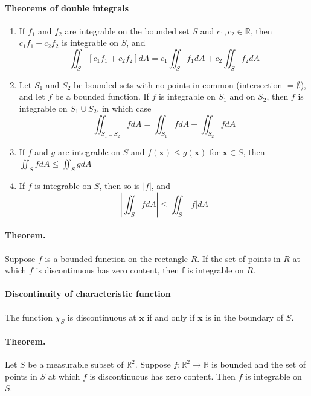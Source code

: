 \documentclass[11pt]{article}
\newcommand{\bx}[0]{\mathbf{x}}
\newcommand{\real}[0]{\mathbb{R}}
\begin{document}
\paragraph{Theorems of double integrals}
\begin{enumerate}
    \item If $f_1$ and $f_2$ are integrable on the bounded set $S$ and $c_1,c_2\in \real$, then $c_1f_1 + c_2f_2$ is integrable on $S$, and
    \begin{equation*}
        \iint_S[c_1f_1 + c_2f_2]dA = c_1\iint_Sf_1dA + c_2\iint_Sf_2dA
    \end{equation*}
    
    \item Let $S_1$ and $S_2$ be bounded sets with no points in common (intersection $ =\emptyset$), and let $f$ be a bounded function. If $f$ is integrable on $S_1$ and on $S_2$, then $f$ is integrable on $S_1\cup S_2$, in which case
    \begin{equation*}
        \iint_{S_1\cup S_2}fdA = \iint_{S_1}fdA + \iint_{S_2} fdA
    \end{equation*}
    
    \item If $f$ and $g$ are integrable on $S$ and $f(\mathbf{x})\leq g(\mathbf{x})$ for $\bx \in S$, then $\iint_S fdA \leq \iint_S g dA$
    
    \item If $f$ is integrable on $S$, then so is $|f|$, and
    \begin{equation*}
        \left|\iint_Sf dA\right| \leq \iint_S|f|dA
    \end{equation*}
\end{enumerate}

\paragraph{Theorem.} Suppose $f$ is a bounded function on the rectangle $R$. If the set of points in $R$ at which $f$ is discontinuous has zero content, then f is integrable on $R$.


\paragraph{Discontinuity of characteristic function} The function $\chi_S$ is discontinuous at $\bx$ if and only if $\bx$ is in the boundary of $S$.

\paragraph{Theorem.} Let $S$ be a measurable subset of $\real^2$. Suppose $f:{\real^2} \rightarrow{}{\real}$ is bounded and the set of points in $S$ at which $f$ is discontinuous has zero content. Then $f$ is integrable on $S$. 
\end{document}
